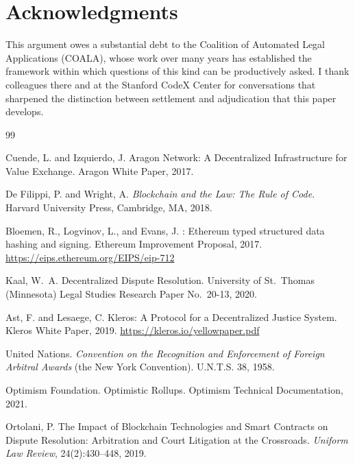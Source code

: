 \documentclass[11pt,a4paper]{article}
\theoremstyle{remark}
\begin{document}
\section*{Acknowledgments}
This argument owes a substantial debt to the Coalition of
Automated Legal Applications (COALA), whose work over many years
has established the framework within which questions of this kind
can be productively asked. I thank colleagues there and at the
Stanford CodeX Center for conversations that sharpened the
distinction between settlement and adjudication that this paper
develops.



\begin{thebibliography}{99}

Cuende, L. and Izquierdo, J.
\newblock Aragon Network: A Decentralized Infrastructure for Value Exchange.
\newblock Aragon White Paper, 2017.

De Filippi, P. and Wright, A.
\newblock \emph{Blockchain and the Law: The Rule of Code}.
\newblock Harvard University Press, Cambridge, MA, 2018.

Bloemen, R., Logvinov, L., and Evans, J.
: Ethereum typed structured data hashing and signing.
\newblock Ethereum Improvement Proposal, 2017.
\newblock \url{https://eips.ethereum.org/EIPS/eip-712}

Kaal, W.~A.
\newblock Decentralized Dispute Resolution.
\newblock University of St.\ Thomas (Minnesota) Legal Studies
  Research Paper No.\ 20-13, 2020.

Ast, F. and Lesaege, C.
\newblock Kleros: A Protocol for a Decentralized Justice System.
\newblock Kleros White Paper, 2019.
\newblock \url{https://kleros.io/yellowpaper.pdf}

United Nations.
\newblock \emph{Convention on the Recognition and Enforcement
  of Foreign Arbitral Awards} (the New York Convention).
 U.N.T.S. 38, 1958.

Optimism Foundation.
\newblock Optimistic Rollups.
\newblock Optimism Technical Documentation, 2021.

Ortolani, P.
\newblock The Impact of Blockchain Technologies and Smart
  Contracts on Dispute Resolution: Arbitration and Court
  Litigation at the Crossroads.
\newblock \emph{Uniform Law Review}, 24(2):430--448, 2019.


\end{thebibliography}
\end{document}
